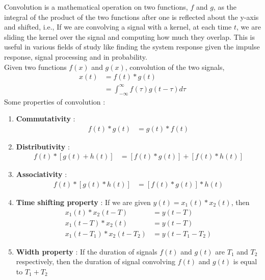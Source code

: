 \documentclass[12pt]{article}
\begin{document}
Convolution is a mathematical operation on two functions, $f$ and $g$, as the integral of the product of the two functions after one is reflected about the y-axis and shifted, i.e., If we are convolving a signal with a kernel, at each time $t$, we are sliding the kernel over the signal and computing how much they overlap. This is useful in various fields of study like finding the system response given the impulse response, signal processing and in probability.\\
Given two functions $f(x)$ and $g(x)$, convolution of the two signals, \\
\begin{align}
	x(t) &= f(t) * g(t) \\
	     &= \int_{-\infty}^{\infty} f(\tau) g(t - \tau) d \tau \label{eq:conv}
\end{align}
Some properties of convolution : \\
\begin{enumerate}
\item \textbf{Commutativity} : 
\begin{align*}
f(t) * g(t) &= g(t) * f(t)
\end{align*}
\item \textbf{Distributivity} :
\begin{align*}
f(t) * [g(t) + h(t)] &= [f(t) * g(t)] + [f(t) * h(t)] 
\end{align*}
\item \textbf{Associativity} :
\begin{align*}
f(t) * [g(t) * h(t)] &= [f(t) * g(t)] * h(t)
\end{align*}
\item \textbf{Time shifting property} :
If we are given $y(t) = x_1 (t) * x_2 (t)$, then
\begin{align*}
	x_1(t) * x_2(t - T) &= y(t - T) \\
	x_1(t - T) * x_2(t) &= y(t - T) \\
	x_1(t - T_1) * x_2(t - T_2) &= y(t - T_1 - T_2)
\end{align*}
\item \textbf{Width property} :
If the duration of signals $f(t)$ and $g(t)$ are $T_1$ and $T_2$ respectively, then the duration of signal convolving $f(t)$ and $g(t)$ is equal to $T_1 + T_2$
\end{enumerate}









\end{document}
